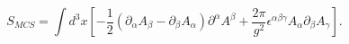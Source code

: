 \begin{equation}
 S_{MCS}=\int d^{3}x[-\frac{1}{2}(\partial_{\alpha}A_{\beta}-\partial_{\beta}A_{\alpha})\partial^{\alpha}A^{\beta}+\frac{2\pi}{g^2}\epsilon^{\alpha\beta\gamma}A_{\alpha}\partial_{\beta}A_{\gamma}].
\label{mcs}
\end{equation}

